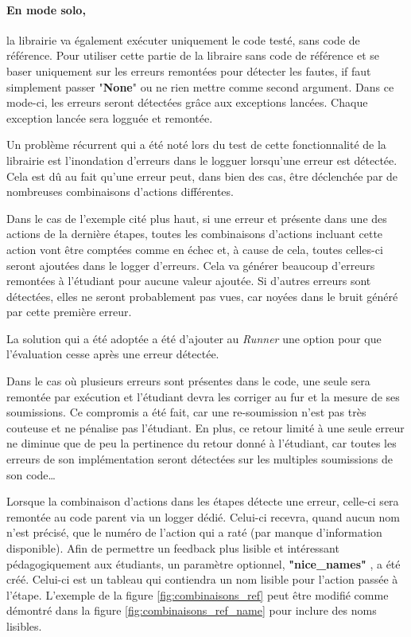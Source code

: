 \documentclass[a4paper]{report}
\begin{document}
\paragraph{En mode solo,} la librairie va également exécuter uniquement le code testé, sans code de référence.
Pour utiliser cette partie de la libraire sans code de référence et se baser uniquement sur les erreurs remontées pour détecter les fautes, if faut simplement passer "\textbf{None}" ou ne rien mettre comme second argument.
Dans ce mode-ci, les erreurs seront détectées grâce aux exceptions lancées.
Chaque exception lancée sera logguée et remontée.


Un problème récurrent qui a été noté lors du test de cette fonctionnalité de la librairie est l'inondation d'erreurs dans le logguer lorsqu’une erreur est détectée.
Cela est dû au fait qu'une erreur peut, dans bien des cas, être déclenchée par de nombreuses combinaisons d'actions différentes.

Dans le cas de l'exemple cité plus haut, si une erreur et présente dans une des actions de la dernière étapes, toutes les combinaisons d'actions incluant cette action vont être comptées comme en échec et, à cause de cela, toutes celles-ci seront ajoutées dans le logger d'erreurs.
Cela va générer beaucoup d'erreurs remontées à l'étudiant pour aucune valeur ajoutée.
Si d'autres erreurs sont détectées, elles ne seront probablement pas vues, car noyées dans le bruit généré par cette première erreur.

La solution qui a été adoptée a été d'ajouter au \textit{Runner} une option pour que l'évaluation cesse après une erreur détectée.

Dans le cas où plusieurs erreurs sont présentes dans le code, une seule sera remontée par exécution et l'étudiant devra les corriger au fur et la mesure de ses soumissions.
Ce compromis a été fait, car une re-soumission n'est pas très couteuse et ne pénalise pas l'étudiant.
En plus, ce retour limité à une seule erreur ne diminue que de peu la pertinence du retour donné à l'étudiant, car toutes les erreurs de son implémentation seront détectées sur les multiples soumissions de son code…
  

Lorsque la combinaison d'actions dans les étapes détecte une erreur, celle-ci sera remontée au code parent via un logger dédié.
Celui-ci recevra, quand aucun nom n'est précisé, que le numéro de l'action qui a raté (par manque d'information disponible).
Afin de permettre un feedback plus lisible et intéressant pédagogiquement aux étudiants, un paramètre optionnel, \textbf{"nice\_names"} , a été créé.
Celui-ci est un tableau qui contiendra un nom lisible pour l’action passée à l'étape.
L'exemple de la figure \ref{fig:combinaisons_ref} peut être modifié comme démontré dans la figure \ref{fig:combinaisons_ref_name} pour inclure des noms lisibles.
\end{document}
